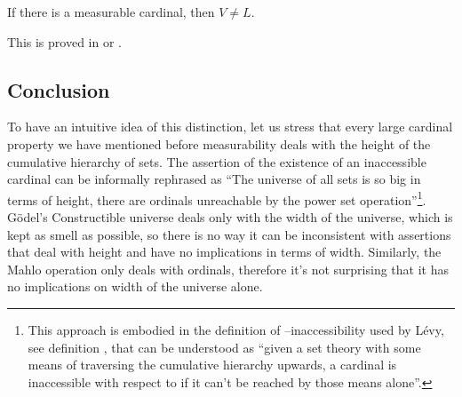\begin{theorem}
If there is a measurable cardinal, then $V \neq L$.
\end{theorem}
This is proved in \cite{scott_measurable_constructible} or \cite{KanamoriBook}.

\subsection{Conclusion}
To have an intuitive idea of this distinction, let us stress that every large cardinal property we have mentioned before measurability deals with the height of the cumulative hierarchy of sets.
The assertion of the existence of an inaccessible cardinal can be informally rephrased as
``The universe of all sets is so big in terms of height, there are ordinals unreachable by the power set operation''\footnote{This approach is embodied in the definition of –inaccessibility used by Lévy, see definition , that can be understood as ``given a set theory with some means of traversing the cumulative hierarchy upwards, a cardinal is inaccessible with respect to  if it can't be reached by those means alone''.}. 
Gödel's Constructible universe deals only with the width of the universe, which is kept as smell as possible, so there is no way it can be inconsistent with assertions that deal with height and have no implications in terms of width. Similarly, the Mahlo operation only deals with ordinals, therefore it's not surprising that it has no implications on width of the universe alone. 

